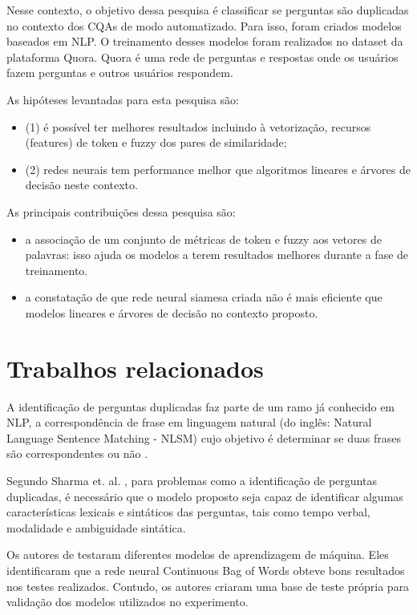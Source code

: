 \documentclass[conference]{IEEEtran}
\begin{document}
Nesse contexto, o objetivo dessa pesquisa é classificar se perguntas são duplicadas no contexto dos CQAs de modo automatizado. Para isso, foram criados modelos baseados em NLP. O treinamento desses modelos foram realizados no dataset da plataforma Quora. Quora é uma rede de perguntas e respostas onde os usuários fazem perguntas e outros usuários respondem.

As hipóteses levantadas para esta pesquisa são:
\begin{itemize}
\item (1) é possível ter melhores resultados incluindo à vetorização, recursos (features) de token e fuzzy dos pares de similaridade;

\item (2) redes neurais tem performance melhor que algoritmos lineares e árvores de decisão neste contexto.
\end{itemize}

As principais contribuições dessa pesquisa são:

\begin{itemize}
\item a associação de um conjunto de métricas de token e fuzzy aos vetores de palavras: isso ajuda os modelos a terem resultados melhores durante a fase de treinamento.
\item a constatação de que rede neural siamesa criada não é mais eficiente que modelos lineares e árvores de decisão no contexto proposto.
\end{itemize}

\section{Trabalhos relacionados}

A identificação de perguntas duplicadas faz parte de um ramo já conhecido em NLP, a correspondência de frase em linguagem natural (do inglês: Natural Language Sentence Matching - NLSM) cujo objetivo é determinar se duas frases são correspondentes ou não \cite{Wang2017}.

Segundo Sharma et. al. \cite{sharma2019}, para problemas como a identificação de perguntas duplicadas, é necessário que o modelo proposto seja capaz de identificar algumas características lexicais e sintáticos das perguntas, tais como tempo verbal, modalidade e ambiguidade sintática.

Os autores de \cite{sharma2019} testaram diferentes modelos de aprendizagem de máquina. Eles identificaram que a rede neural Continuous Bag of Words obteve bons resultados nos testes realizados. Contudo, os autores criaram uma base de teste própria para validação dos modelos utilizados no experimento.
\end{document}
